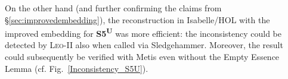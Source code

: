\documentclass{llncs}
\newcommand{\logic}[1]{\textbf{#1}\xspace}
\newcommand{\SFiveU}{\logic{S5\textsuperscript{U}}}
\begin{document}
On the other hand (and further confirming the claims from \S\ref{sec:improvedembedding}), 
the reconstruction in Isabelle/HOL with the improved embedding for \SFiveU was more efficient: 
the inconsistency could be detected
by \textsc{Leo-II} also when called via
Sledgehammer. Moreover, the result could subsequently be verified with
Metis even without the Empty Essence Lemma (cf. Fig.~\ref{Inconsistency_S5U}). 
\end{document}
